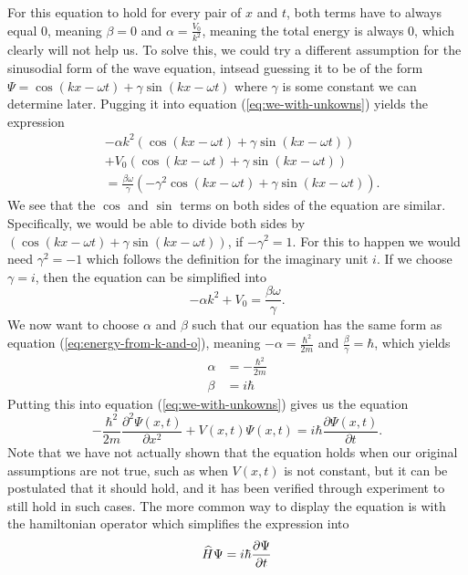     For this equation to hold for every pair of $x$ and $t$, both terms have to always equal 0, meaning $\beta=0$ and $\alpha =\frac{V_0}{k^2}$, meaning the total energy is always 0, which clearly will not help us. To solve this, we could try a different assumption for the sinusodial form of the wave equation, intsead guessing it to be of the form $\Psi=\cos(kx-\omega t) +\gamma\sin(kx-\omega t ) $ where $\gamma$ is some constant we can determine later. Pugging it into equation (\ref{eq:we-with-unkowns}) yields the expression 
    \begin{equation}
    \begin{split}    
        &-\alpha k^2(\cos(kx-\omega t ) +\gamma\sin(kx-\omega t))\\ 
        &+ V_0(\cos(kx - \omega t) + \gamma\sin(kx - \omega t)) \\ 
        &=  \frac{\beta\omega}{\gamma}(-\gamma^2\cos(kx -  \omega t) + \gamma\sin(kx - \omega t)).
    \end{split}
    \end{equation}
    We see that the $\cos$ and $\sin$ terms on both sides of the equation are similar. Specifically, we would be able to divide both sides by $(\cos(kx-\omega t)+\gamma\sin(kx-\omega t))$, if $-\gamma^2=1$. For this to happen we would need $\gamma^2=-1 $ which follows the definition for the imaginary unit $i$. If we choose $\gamma=i$, then the equation can be simplified into 
    \begin{equation}
        -\alpha k^2+V_0=\frac{\beta\omega}{\gamma}.
    \end{equation} 
    We now want to choose $\alpha$ and $\beta$ such that our equation has the same form as equation (\ref{eq:energy-from-k-and-o}), meaning $-\alpha=\frac{\hbar^2}{2m}$ and $\frac{\beta}{\gamma}=\hbar$, which yields \begin{equation}
        \begin{split}
            \alpha &=-\frac{\hbar^2}{2m} \\
            \beta &=i\hbar
        \end{split}
    \end{equation}
    Putting this into equation (\ref{eq:we-with-unkowns}) gives us the equation 
    \begin{equation}
        -\frac{\hbar^2}{2m}\frac{\partial^2\Psi(x,t)}{\partial x^2}+V(x,t)\Psi(x,t)=i\hbar\frac{\partial\Psi(x,t)}{\partial t}.
    \end{equation}
    Note that we have not actually shown that the equation holds when our original assumptions are not true, such as when $V(x,t)$ is not constant, but it can be postulated that it should hold, and it has been verified through experiment to still hold in such cases. The more common way to display the equation is with the hamiltonian operator which simplifies the expression into 
    \begin{equation}
        \widehat{H}\Psi=i\hbar\frac{\partial\Psi}{\partial t}
    \end{equation}
    


    




